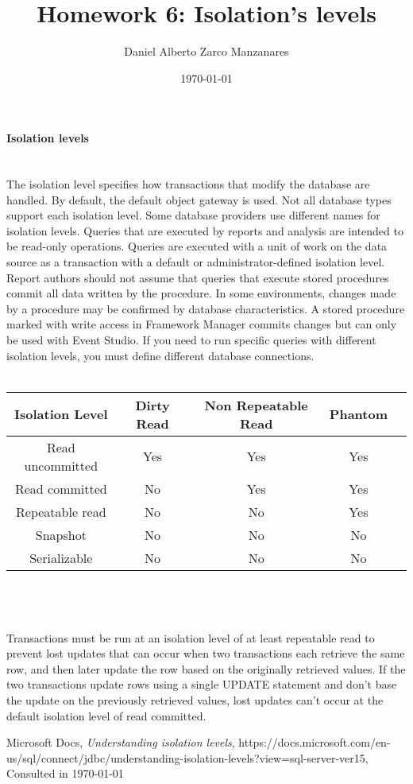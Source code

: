 \documentclass{article}
\begin{document}
	
\title{Homework 6: Isolation's levels}
\author{Daniel Alberto Zarco Manzanares}
\date{\today}
\maketitle
\paragraph{Isolation levels\\\\}
The isolation level specifies how transactions that modify the database are handled. By default, the default object gateway is used. Not all database types support each isolation level. Some database providers use different names for isolation levels.
Queries that are executed by reports and analysis are intended to be read-only operations. Queries are executed with a unit of work on the data source as a transaction with a default or administrator-defined isolation level. Report authors should not assume that queries that execute stored procedures commit all data written by the procedure. In some environments, changes made by a procedure may be confirmed by database characteristics. A stored procedure marked with write access in Framework Manager commits changes but can only be used with Event Studio.
If you need to run specific queries with different isolation levels, you must define different database connections.\\\\
\begin{tabular}{|c|c|c|c|c|}
Isolation Level & Dirty Read & Non Repeatable Read & Phantom\\
\hline
Read uncommitted & Yes & Yes & Yes\\
Read committed & No & Yes & Yes\\
Repeatable read & No & No & Yes\\
Snapshot & No & No & No\\
Serializable & No & No & No\\
\end{tabular}
\\\\\\Transactions must be run at an isolation level of at least repeatable read to prevent lost updates that can occur when two transactions each retrieve the same row, and then later update the row based on the originally retrieved values. If the two transactions update rows using a single UPDATE statement and don't base the update on the previously retrieved values, lost updates can't occur at the default isolation level of read committed.
\begin{thebibliography}{2}
  Microsoft Docs,
  \textit{Understanding isolation levels},
  https://docs.microsoft.com/en-us/sql/connect/jdbc/understanding-isolation-levels?view=sql-server-ver15,
  Consulted in {\today}
 \end{thebibliography}
\end{document}
